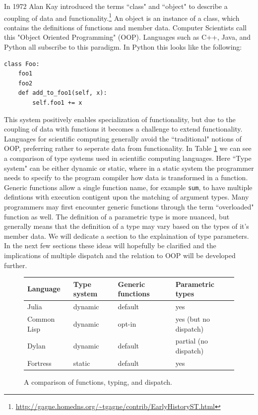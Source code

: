 In 1972 Alan Kay introduced the terms
``class" and ``object" to describe a coupling of data and functionality.\footnote{\url{http://gagne.homedns.org/~tgagne/contrib/EarlyHistoryST.html}}
An object is an instance of a class, which contains the definitions of 
functions and member data. Computer Scientists
call this "Object Oriented Programming" (OOP).
Languages such as C++, Java, and Python all subscribe to this paradigm.
In Python this looks like the following:
\begin{lstlisting}
class Foo:
    foo1
    foo2
    def add_to_foo1(self, x):
        self.foo1 += x
\end{lstlisting}

This system positively enables specialization of functionality, but due
to the coupling of data with functions it becomes a challenge to extend
functionality. Languages for scientific computing generally avoid the
``traditional" notions
of OOP, preferring rather to seperate data from
functionality. In Table \ref{tab:types} we can see a
comparison of type systems used in scientific computing languages. Here ``Type
system" can be either dynamic or static, where in a static system the programmer
needs to specify to the program compiler how data is transformed in a function.
Generic functions allow a single function name, for example \texttt{sum}, to have
multiple defintions with execution contigent upon the matching of argument
types. Many programmers may first encounter generic functions through the
term ``overloaded" function as well.
The definition of a parametric type is more nuanced, but generally
means that the definition of a type may vary based on the types of it's
member data. We will dedicate a section to the explaination of type parameters.
In the next
few sections these ideas will hopefully be clarified and the implications of
multiple dispatch and the relation to OOP will be developed further.


\begin{figure}[h!]
  \centering
    \caption{A comparison of functions, typing, and dispatch.}
    \begin{tabular}{ l | l l l}
    Language & Type system & Generic functions & Parametric types \\
    \hline
    Julia & dynamic & default & yes \\
    Common Lisp & dynamic & opt-in & yes (but no dispatch) \\
    Dylan & dynamic & default & partial (no dispatch) \\
    Fortress & static & default & yes \\
    \end{tabular}
  \label{tab:types}
\end{figure}


